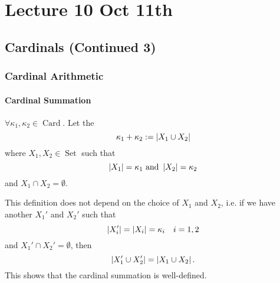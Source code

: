 \documentclass[notoc,notitlepage]{tufte-book}
\DeclareMathOperator{\Card}{Card }
\DeclareMathOperator{\Set}{Set }
\begin{document}


\chapter{Lecture 10 Oct 11th}%
\label{chp:lecture_10_oct_11th}

\section{Cardinals (Continued 3)}%
\label{sec:cardinals_continued_3}

\subsection{Cardinal Arithmetic}%
\label{sub:cardinal_arithmetic}

\subsubsection{Cardinal Summation}%
\label{ssub:cardinal_summation}

\begin{defn}\label{defn:cardinal_sum}
  $\forall \kappa_1, \kappa_2 \in \Card$. Let the 
  \begin{equation*}
    \kappa_1 + \kappa_2 := \left|X_1 \cup X_2\right|
  \end{equation*}
  where $X_1, X_2 \in \Set$ such that
  \begin{equation*}
    \left|X_1\right| = \kappa_1 \text{ and } \left|X_2\right| = \kappa_2
  \end{equation*}
  and $X_1 \cap X_2 = \emptyset$.
\end{defn}

\begin{remark}
  This definition does not depend on the choice of $X_1$ and $X_2$, i.e. if we have another $X_1'$ and $X_2'$ such that
  \begin{equation*}
    \left|X_i'\right| = \left|X_i\right| = \kappa_i \quad i = 1, 2
  \end{equation*}
  and $X_1' \cap X_2' = \emptyset$, then
  \begin{equation*}
    \left|X_1' \cup X_2'\right| = \left|X_1 \cup X_2\right|.
  \end{equation*}
  This shows that the cardinal summation is well-defined.
\end{remark}
\end{document}
